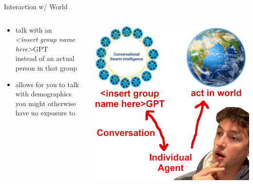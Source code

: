\documentclass[aspectratio=169]{beamer}
\begin{document}
\begin{frame}{Interaction w/ World}
\begin{columns}[T]
    \begin{column}[T]{0.5\textwidth}
        \begin{itemize}
            \item talk with an\\ \textit{<insert group name here>}GPT\\ instead of an actual person in that group
            \item allows for you to talk with demographics you might otherwise have no exposure to
        \end{itemize}
    \end{column}
    \begin{column}{0.5\textwidth}
        \includegraphics[height=0.8\textheight]{imgs/CSI_section/agency.png}
    \end{column}
\end{columns}
\end{frame}
\end{document}
